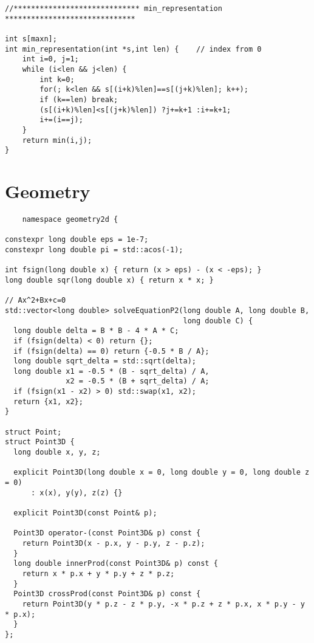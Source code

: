 \documentclass[6pt]{article}
\begin{document}
\begin{multicols}{2}
\begin{lstlisting}
//***************************** min_representation ******************************

int s[maxn];
int min_representation(int *s,int len) {    // index from 0
    int i=0, j=1;
    while (i<len && j<len) {
        int k=0;
        for(; k<len && s[(i+k)%len]==s[(j+k)%len]; k++);
        if (k==len) break;
        (s[(i+k)%len]<s[(j+k)%len]) ?j+=k+1 :i+=k+1;
        i+=(i==j);
    }
    return min(i,j);
}
\end{lstlisting}

  \section{Geometry}

  \begin{lstlisting}
    namespace geometry2d {

constexpr long double eps = 1e-7;
constexpr long double pi = std::acos(-1);

int fsign(long double x) { return (x > eps) - (x < -eps); }
long double sqr(long double x) { return x * x; }

// Ax^2+Bx+c=0
std::vector<long double> solveEquationP2(long double A, long double B,
                                         long double C) {
  long double delta = B * B - 4 * A * C;
  if (fsign(delta) < 0) return {};
  if (fsign(delta) == 0) return {-0.5 * B / A};
  long double sqrt_delta = std::sqrt(delta);
  long double x1 = -0.5 * (B - sqrt_delta) / A,
              x2 = -0.5 * (B + sqrt_delta) / A;
  if (fsign(x1 - x2) > 0) std::swap(x1, x2);
  return {x1, x2};
}

struct Point;
struct Point3D {
  long double x, y, z;

  explicit Point3D(long double x = 0, long double y = 0, long double z = 0)
      : x(x), y(y), z(z) {}

  explicit Point3D(const Point& p);

  Point3D operator-(const Point3D& p) const {
    return Point3D(x - p.x, y - p.y, z - p.z);
  }
  long double innerProd(const Point3D& p) const {
    return x * p.x + y * p.y + z * p.z;
  }
  Point3D crossProd(const Point3D& p) const {
    return Point3D(y * p.z - z * p.y, -x * p.z + z * p.x, x * p.y - y * p.x);
  }
};


\end{lstlisting}
\end{multicols}
\end{document}

